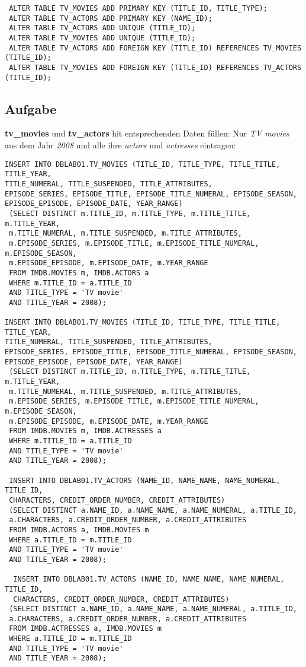 \documentclass[11pt,a4paper,DIV=9]{scrartcl}
\newcounter{temp}
\newcommand{\aufgabe}[1]{
  \setcounter{temp}{\value{subsection}}
  \setcounter{subsection}{#1}
  \addtocounter{subsection}{-1}
  \subsection{Aufgabe}
  \setcounter{subsection}{\value{temp}}
}
\begin{document}
 \begin{lstlisting}
 ALTER TABLE TV_MOVIES ADD PRIMARY KEY (TITLE_ID, TITLE_TYPE);
 ALTER TABLE TV_ACTORS ADD PRIMARY KEY (NAME_ID); 
 ALTER TABLE TV_ACTORS ADD UNIQUE (TITLE_ID);
 ALTER TABLE TV_MOVIES ADD UNIQUE (TITLE_ID);
 ALTER TABLE TV_ACTORS ADD FOREIGN KEY (TITLE_ID) REFERENCES TV_MOVIES (TITLE_ID);
 ALTER TABLE TV_MOVIES ADD FOREIGN KEY (TITLE_ID) REFERENCES TV_ACTORS (TITLE_ID);
 \end{lstlisting}
 \aufgabe{6}
 \textbf{tv\_movies} und \textbf{tv\_actors} hit entsprechenden Daten f\"ullen:
 Nur \textit{TV movies} aus dem Jahr \textit{2008} und alle ihre \textit{actors} und \textit{actresses} eintragen:
 \begin{lstlisting}
INSERT INTO DBLAB01.TV_MOVIES (TITLE_ID, TITLE_TYPE, TITLE_TITLE, TITLE_YEAR, 
TITLE_NUMERAL, TITLE_SUSPENDED, TITLE_ATTRIBUTES, 
EPISODE_SERIES, EPISODE_TITLE, EPISODE_TITLE_NUMERAL, EPISODE_SEASON, 
EPISODE_EPISODE, EPISODE_DATE, YEAR_RANGE)
 (SELECT DISTINCT m.TITLE_ID, m.TITLE_TYPE, m.TITLE_TITLE, m.TITLE_YEAR, 
 m.TITLE_NUMERAL, m.TITLE_SUSPENDED, m.TITLE_ATTRIBUTES, 
 m.EPISODE_SERIES, m.EPISODE_TITLE, m.EPISODE_TITLE_NUMERAL, m.EPISODE_SEASON, 
 m.EPISODE_EPISODE, m.EPISODE_DATE, m.YEAR_RANGE
 FROM IMDB.MOVIES m, IMDB.ACTORS a
 WHERE m.TITLE_ID = a.TITLE_ID
 AND TITLE_TYPE = 'TV movie'
 AND TITLE_YEAR = 2008);
 
INSERT INTO DBLAB01.TV_MOVIES (TITLE_ID, TITLE_TYPE, TITLE_TITLE, TITLE_YEAR, 
TITLE_NUMERAL, TITLE_SUSPENDED, TITLE_ATTRIBUTES, 
EPISODE_SERIES, EPISODE_TITLE, EPISODE_TITLE_NUMERAL, EPISODE_SEASON, 
EPISODE_EPISODE, EPISODE_DATE, YEAR_RANGE)
 (SELECT DISTINCT m.TITLE_ID, m.TITLE_TYPE, m.TITLE_TITLE, m.TITLE_YEAR, 
 m.TITLE_NUMERAL, m.TITLE_SUSPENDED, m.TITLE_ATTRIBUTES, 
 m.EPISODE_SERIES, m.EPISODE_TITLE, m.EPISODE_TITLE_NUMERAL, m.EPISODE_SEASON, 
 m.EPISODE_EPISODE, m.EPISODE_DATE, m.YEAR_RANGE
 FROM IMDB.MOVIES m, IMDB.ACTRESSES a
 WHERE m.TITLE_ID = a.TITLE_ID
 AND TITLE_TYPE = 'TV movie'
 AND TITLE_YEAR = 2008);
 
 INSERT INTO DBLAB01.TV_ACTORS (NAME_ID, NAME_NAME, NAME_NUMERAL, TITLE_ID, 
 CHARACTERS, CREDIT_ORDER_NUMBER, CREDIT_ATTRIBUTES)
 (SELECT DISTINCT a.NAME_ID, a.NAME_NAME, a.NAME_NUMERAL, a.TITLE_ID, 
 a.CHARACTERS, a.CREDIT_ORDER_NUMBER, a.CREDIT_ATTRIBUTES
 FROM IMDB.ACTORS a, IMDB.MOVIES m
 WHERE a.TITLE_ID = m.TITLE_ID
 AND TITLE_TYPE = 'TV movie'
 AND TITLE_YEAR = 2008);
 
  INSERT INTO DBLAB01.TV_ACTORS (NAME_ID, NAME_NAME, NAME_NUMERAL, TITLE_ID, 
  CHARACTERS, CREDIT_ORDER_NUMBER, CREDIT_ATTRIBUTES)
 (SELECT DISTINCT a.NAME_ID, a.NAME_NAME, a.NAME_NUMERAL, a.TITLE_ID, 
 a.CHARACTERS, a.CREDIT_ORDER_NUMBER, a.CREDIT_ATTRIBUTES
 FROM IMDB.ACTRESSES a, IMDB.MOVIES m
 WHERE a.TITLE_ID = m.TITLE_ID
 AND TITLE_TYPE = 'TV movie'
 AND TITLE_YEAR = 2008);
 
 \end{lstlisting}
\end{document}
